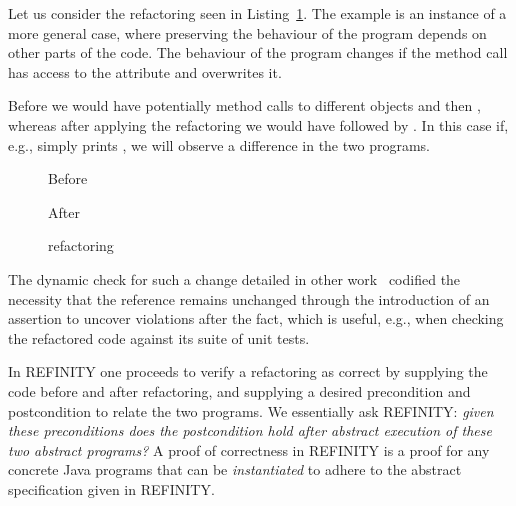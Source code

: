 Let us consider the  refactoring seen in Listing~\ref{lst:ExtractVariable-java}.
The example is an instance of a more general case, where preserving the behaviour of the program depends on other parts of the code.
The behaviour of the program changes if the method call  has access to the attribute  and overwrites it.

Before we would have potentially method calls to different objects  and then , whereas after applying the refactoring we would
have  followed by .
In this case if, e.g.,  simply prints , we will observe a difference in the two programs.

\begin{figure}[tbp]
  \captionsetup{type=lstlisting}
  \centering
  \begin{sublstlisting}[b]{.2\linewidth}
    
    \caption{Before}
  \end{sublstlisting}\hspace{1.5cm}
  \begin{sublstlisting}[b]{.34\linewidth}
    
    \caption{After}
  \end{sublstlisting}
  \caption{ refactoring}
  \label{lst:ExtractVariable-java}
\end{figure}

The dynamic check for such a change detailed in other work~\cite{stolz:isolarefa} codified the necessity that the reference 
remains unchanged through the introduction of an assertion  to uncover violations after the fact,
which is useful, e.g., when checking the refactored code against its suite of unit tests.

In REFINITY one proceeds to verify a refactoring as correct by supplying the code before and after refactoring, and supplying a desired precondition and postcondition to relate the two programs.
We essentially ask REFINITY: \emph{given these preconditions does the postcondition hold after abstract execution of these two abstract programs?}
A proof of correctness in REFINITY is a proof for any concrete Java programs that can be \emph{instantiated} to adhere to the abstract specification given in REFINITY.

